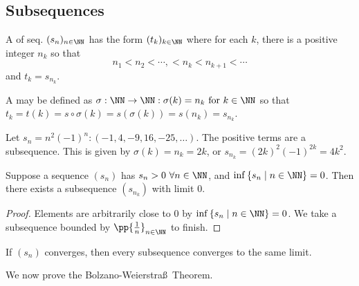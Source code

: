 \documentclass[11pt]{scrartcl}
\numberwithin{equation}{section}
\begin{document}
\subsection{Subsequences}
\begin{definition}
    A  of seq. $(s_n)_{n\in\NN}$ has the form 
    $(t_k)_{k\in\NN}$ where for each $k$, there is a positive integer 
    $n_k$ so that 
    \[ n_1 < n_2 <\cdots,< n_k<n_{k+1}<\cdots\]
    and $t_k = s_{n_k}$.
    
    A  may be defined as 
    $\sigma : \NN \rightarrow \NN: \sigma(k) = n_k \text{ for } k \in \NN$
    so that $t_k = t(k) =  s \circ \sigma (k) = s(\sigma(k)) = s(n_k) = s_{n_k}$.
\end{definition}
\begin{example}
    Let $s_n = n^2(-1)^n : (-1,4,-9,16,-25,\dots)$.
    The positive terms are a subsequence. This is given by 
    $\sigma(k) = n_k=2k$, or $s_{n_k}=(2k)^2(-1)^{2k} = 4k^2$.
\end{example}

\begin{proposition}
    Suppose a sequence $(s_n)$ has $s_n>0\ \forall n \in \NN$,
    and $\inf \left\{s_n\mid n\in \NN\right\} = 0$.
    Then there exists a subsequence $(s_{n_k})$ with limit $0$.
\end{proposition}

\begin{proof}
    Elements are arbitrarily close to $0$ by
    $\inf \left\{s_n\mid n \in\NN\right\} = 0$. 
    We take a subsequence bounded by $\pp{\frac{1}{n}}_{n\in\NN}$ 
    to finish.
\end{proof}

\begin{proposition}
    If $(s_n)$ converges, then every subsequence converges to the 
    same limit.
\end{proposition}

We now prove the Bolzano-Weierstra\ss \ Theorem.
\end{document}
